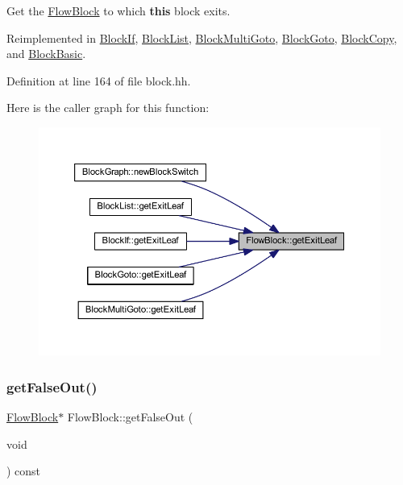 Get the \mbox{\hyperlink{class_flow_block}{Flow\+Block}} to which {\bfseries{this}} block exits. 



Reimplemented in \mbox{\hyperlink{class_block_if_a9adb3bd7302e374459669718f1265826}{Block\+If}}, \mbox{\hyperlink{class_block_list_afa30fcb7c819884d7bbfe07548b4253d}{Block\+List}}, \mbox{\hyperlink{class_block_multi_goto_a54ba810882911521ff2ca84b6458228a}{Block\+Multi\+Goto}}, \mbox{\hyperlink{class_block_goto_a18080132d5cd3398eb972335368359e2}{Block\+Goto}}, \mbox{\hyperlink{class_block_copy_ae7643bde7387390aaf61e2b4747bc5a7}{Block\+Copy}}, and \mbox{\hyperlink{class_block_basic_ad0ca2052c33af69cce69198ebfac27d1}{Block\+Basic}}.



Definition at line 164 of file block.\+hh.

Here is the caller graph for this function\+:
\nopagebreak
\begin{figure}[H]
\begin{center}
\leavevmode
\includegraphics[width=350pt]{class_flow_block_a611bb926194635a0f5cfc0eb16cabe6a_icgraph}
\end{center}
\end{figure}
\mbox{\label{class_flow_block_aadc5b837e1a1a2acc37f1f9cbcf04497}} 
\subsubsection{\texorpdfstring{getFalseOut()}{getFalseOut()}}
{\footnotesize\ttfamily \mbox{\hyperlink{class_flow_block}{Flow\+Block}}$\ast$ Flow\+Block\+::get\+False\+Out (\begin{DoxyParamCaption}\item[{void}]{ }\end{DoxyParamCaption}) const\hspace{0.3cm}{\ttfamily [inline]}}



